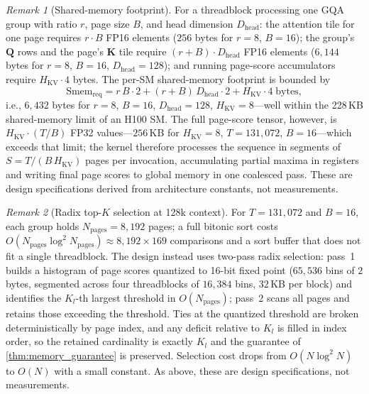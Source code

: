 \documentclass[final,5p,times,twocolumn]{elsarticle}
\theoremstyle{definition}
\theoremstyle{remark}
\newtheorem{remark}{Remark}
\newcommand{\HKV}{H_{\mathrm{KV}}}
\newcommand{\Dhead}{D_{\mathrm{head}}}
\begin{document}
\begin{remark}[Shared-memory footprint]
\label{rem:smem}
For a threadblock processing one GQA group with ratio $r$, page size
 $B$, and head dimension $\Dhead$: the attention tile for one page
requires $r\cdot B$ FP16 elements ($256$ bytes for $r{=}8$, $B{=}16$);
the group's $\mathbf{Q}$ rows and the page's $\mathbf{K}$ tile require
 $(r+B)\cdot\Dhead$ FP16 elements ($6{,}144$ bytes for $r{=}8$,
 $B{=}16$, $\Dhead{=}128$); and running page-score accumulators require
 $\HKV\cdot 4$ bytes. The per-SM shared-memory footprint is bounded by
\begin{equation}
  \mathrm{Smem}_{\mathrm{req}} = r\,B\cdot 2 + (r+B)\,\Dhead\cdot 2
  + \HKV\cdot 4
  \;\text{bytes},
  \label{eq:smem_footprint}
\end{equation}
i.e., $6{,}432$ bytes for $r{=}8$, $B{=}16$, $\Dhead{=}128$,
 $\HKV{=}8$---well within the 228\,KB shared-memory limit of an H100 SM.
The full page-score tensor, however, is $\HKV\cdot(T/B)$ FP32
values---$256$\,KB for $\HKV{=}8$, $T=131{,}072$, $B{=}16$---which
exceeds that limit; the kernel therefore processes the sequence in
segments of $S=T/(B\,\HKV)$ pages per invocation, accumulating partial
maxima in registers and writing final page scores to global memory in
one coalesced pass. These are design specifications derived from
architecture constants, not measurements.
\end{remark}

\begin{remark}[Radix top-$K$ selection at 128k context]
\label{rem:topk}
For $T=131{,}072$ and $B=16$, each group holds
 $N_{\mathrm{pages}}=8{,}192$ pages; a full bitonic sort costs
 $O(N_{\mathrm{pages}}\log^2 N_{\mathrm{pages}})\approx
8{,}192\times 169$ comparisons and a sort buffer that does not fit a
single threadblock. The design instead uses two-pass radix selection:
pass~1 builds a histogram of page scores quantized to 16-bit fixed
point ($65{,}536$ bins of $2$ bytes, segmented across four threadblocks
of $16{,}384$ bins, $32$\,KB per block) and identifies the $K_l$-th
largest threshold in $O(N_{\mathrm{pages}})$; pass~2 scans all pages and
retains those exceeding the threshold. Ties at the quantized threshold
are broken deterministically by page index, and any deficit relative to
 $K_l$ is filled in index order, so the retained cardinality is exactly
 $K_l$ and the guarantee of \cref{thm:memory_guarantee} is preserved.
Selection cost drops from $O(N\log^2 N)$ to $O(N)$ with a small
constant. As above, these are design specifications, not measurements.
\end{remark}
\end{document}
